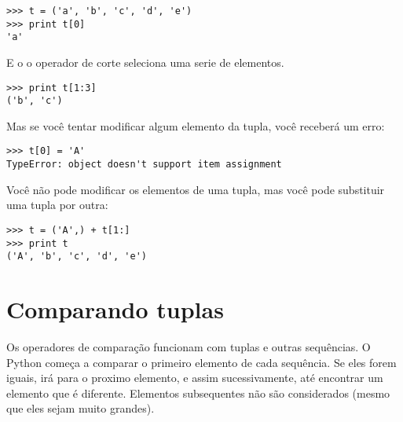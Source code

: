 
\beforeverb
\begin{verbatim}
>>> t = ('a', 'b', 'c', 'd', 'e')
>>> print t[0]
'a'
\end{verbatim}
\afterverb
%
E o o operador de corte seleciona uma serie de elementos.


\beforeverb
\begin{verbatim}
>>> print t[1:3]
('b', 'c')
\end{verbatim}
\afterverb
%
Mas se você tentar modificar algum elemento da tupla, você receberá
um erro:


\beforeverb
\begin{verbatim}
>>> t[0] = 'A'
TypeError: object doesn't support item assignment
\end{verbatim}
\afterverb
%
Você não pode modificar os elementos de uma tupla, mas você pode
substituir uma tupla por outra:

\beforeverb
\begin{verbatim}
>>> t = ('A',) + t[1:]
>>> print t
('A', 'b', 'c', 'd', 'e')
\end{verbatim}
\afterverb
%

\section{Comparando tuplas}


Os operadores de comparação funcionam com tuplas e outras sequências.
O Python começa a comparar o primeiro elemento de cada sequência.
Se eles forem iguais, irá para o proximo elemento, e assim sucessivamente,
até encontrar um elemento que é diferente. Elementos subsequentes
não são considerados (mesmo que eles sejam muito grandes).

